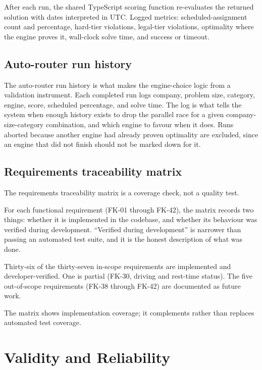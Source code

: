 After each run, the shared TypeScript scoring function re-evaluates the returned solution with dates interpreted in UTC. Logged metrics: scheduled-assignment count and percentage, hard-tier violations, legal-tier violations, optimality where the engine proves it, wall-clock solve time, and success or timeout.

\subsection{Auto-router run history}
\label{sec:eval-auto-router}

The auto-router run history is what makes the engine-choice logic from  a validation instrument. Each completed run logs company, problem size, category, engine, score, scheduled percentage, and solve time. The log is what tells the system when enough history exists to drop the parallel race for a given company-size-category combination, and which engine to favour when it does. Runs aborted because another engine had already proven optimality are excluded, since an engine that did not finish should not be marked down for it.

\subsection{Requirements traceability matrix}
\label{sec:eval-traceability}

The requirements traceability matrix is a coverage check, not a quality test.

For each functional requirement (FK-01 through FK-42), the matrix records two things: whether it is implemented in the codebase, and whether its behaviour was verified during development. ``Verified during development'' is narrower than passing an automated test suite, and it is the honest description of what was done.

Thirty-six of the thirty-seven in-scope requirements are implemented and developer-verified. One is partial (FK-30, driving and rest-time status). The five out-of-scope requirements (FK-38 through FK-42) are documented as future work.

The matrix shows implementation coverage; it complements rather than replaces automated test coverage.


\section{Validity and Reliability}
\label{sec:validity}

